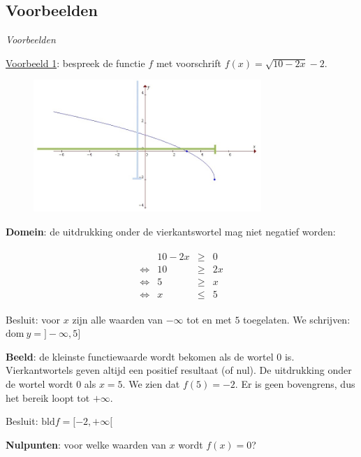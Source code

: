 \subsection{Voorbeelden}

\emph{Voorbeelden}

\noindent \uline{Voorbeeld 1}: bespreek de functie $f$ met voorschrift $f(x)=\sqrt{10-2x}-2$.

\begin{figure}[h]
	\centering{}\includegraphics[height=5cm]{2_elem_rekenvaardigheden_B/inputs/reeel_vb1.jpg} 
\end{figure}


\noindent \textbf{Domein}: de uitdrukking onder de vierkantswortel
mag niet negatief worden:

\noindent 
\begin{eqnarray*}
	\begin{array}{cccc}
		& 10-2x & \geqslant & 0\\
		\iff & 10 & \geqslant & 2x\\
		\iff & 5 & \geqslant & x\\
		\iff & x & \leqslant & 5
	\end{array}
\end{eqnarray*}


\noindent Besluit: voor $x$ zijn alle waarden van $-\infty$ tot
en met $5$ toegelaten. We schrijven: $\textrm{dom}\:y=]-\infty,5]$ 

\medskip{}


\noindent \textbf{Beeld}: de kleinste functiewaarde wordt
bekomen als de wortel $0$ is. Vierkantwortels geven altijd een positief
resultaat (of nul). De uitdrukking onder de wortel wordt $0$ als
$x=5$. We zien dat $f(5)=-2$. Er is geen bovengrens, dus het bereik
loopt tot $+\infty$.

\noindent Besluit: $\textrm{bld}f=[-2,+\infty[$

\medskip{}


\noindent \textbf{Nulpunten}: voor welke waarden van $x$ wordt $f(x)=0$?

